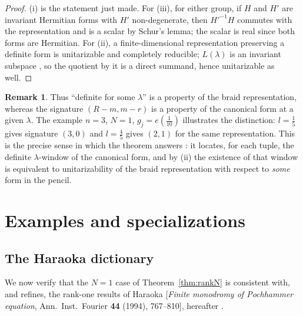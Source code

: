 \documentclass[11pt]{article}
\theoremstyle{definition}
\newtheorem{remark}[theorem]{Remark}
\begin{document}
\begin{proof}
(i) is the statement just made. For (iii), for either group, if $H$
and $H'$ are invariant Hermitian forms with $H'$ non-degenerate, then
$H'^{-1}H$ commutes with the representation and is a scalar by
Schur's lemma;
the scalar is real since both forms are Hermitian. For (ii), a finite-dimensional
representation preserving a definite form is unitarizable and
completely reducible; $L(\lambda)$ is an invariant subspace
\cite[Lemma~3]{N-KLM}, so the quotient by it is a direct
summand, hence unitarizable as well.
\end{proof}

\begin{remark}
Thus ``definite for some $\lambda$'' is a property of the braid
representation, whereas the signature $(R-m,m-r)$ is a property of the
canonical form at a given $\lambda$. The example $n=3$, $N=1$,
$g_j=e(\tfrac1{10})$ illustrates the distinction: $l=\tfrac15$ gives
signature $(3,0)$ and $l=\tfrac45$ gives $(2,1)$ for the same
representation. This is the precise sense in which the theorem
answers \cite[Problem~18]{N-KLM}: it locates, for each tuple, the
definite $\lambda$-window of the canonical form, and by (ii) the
existence of that window is equivalent to unitarizability of the
braid representation with respect to \emph{some} form in the pencil.
\end{remark}

\section{Examples and specializations}
\label{sec:BH}
\subsection{The Haraoka dictionary}\label{subsec:haraoka}

We now verify that the $N=1$ case of Theorem~\ref{thm:rankN} is
consistent with, and refines,
the rank-one results of Haraoka
[\emph{Finite monodromy of Pochhammer equation}, Ann.\ Inst.\ Fourier
\textbf{44} (1994), 767--810], hereafter \cite{Haraoka1994}.
\end{document}
